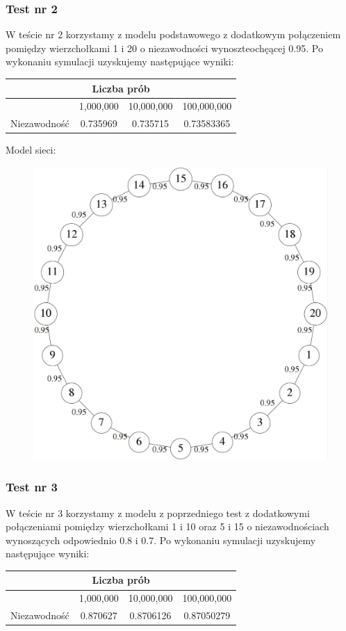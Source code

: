 \documentclass[titlepage]{article}
\begin{document}
\subsubsection{Test nr 2}
W teście nr 2 korzystamy z modelu podstawowego z dodatkowym połączeniem pomiędzy wierzchołkami 1 i 20 o niezawodności wynoszteochęącej 0.95. Po wykonaniu symulacji uzyskujemy następujące wyniki:
\begin{table}[h!]
	\centering
    \label{tab:table2}
    \begin{tabular}{|c|c|c|c|}
    		\multicolumn{4}{c}{Liczba prób}\\
    		\hline
      	& 1,000,000 & 10,000,000 & 100,000,000\\
      	\hline
      	Niezawodność & 0.735969 & 0.735715 & 0.73583365\\
		\hline
    \end{tabular}
\end{table}

\noindent Model sieci:
\begin{figure}[h!]
	\centering
	\includegraphics[width=0.8\linewidth]{graph2.jpg}
\end{figure}

\newpage
\subsubsection{Test nr 3}
W teście nr 3 korzystamy z modelu z poprzedniego test z dodatkowymi połączeniami pomiędzy wierzchołkami 1 i 10 oraz 5 i 15 o niezawodnościach wynoszących odpowiednio 0.8 i 0.7. Po wykonaniu symulacji uzyskujemy następujące wyniki:
\begin{table}[h!]
	\centering
    \label{tab:table3}
    \begin{tabular}{|c|c|c|c|}
    		\multicolumn{4}{c}{Liczba prób}\\
    		\hline
      	& 1,000,000 & 10,000,000 & 100,000,000\\
      	\hline
      	Niezawodność & 0.870627 & 0.8706126 & 0.87050279\\
		\hline
    \end{tabular}
\end{table}
\end{document}
